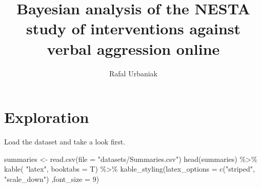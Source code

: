 \documentclass[
  10pt,
  dvipsnames,enabledeprecatedfontcommands]{scrartcl}
\title{Bayesian analysis of the NESTA study of interventions against
verbal aggression online}
\author{Rafal Urbaniak}
\date{}
\newenvironment{Shaded}{\begin{snugshade}}{\end{snugshade}}
\newcommand{\AttributeTok}[1]{\textcolor[rgb]{0.77,0.63,0.00}{#1}}
\newcommand{\DecValTok}[1]{\textcolor[rgb]{0.00,0.00,0.81}{#1}}
\newcommand{\FunctionTok}[1]{\textcolor[rgb]{0.00,0.00,0.00}{#1}}
\newcommand{\NormalTok}[1]{#1}
\newcommand{\OtherTok}[1]{\textcolor[rgb]{0.56,0.35,0.01}{#1}}
\newcommand{\SpecialCharTok}[1]{\textcolor[rgb]{0.00,0.00,0.00}{#1}}
\newcommand{\StringTok}[1]{\textcolor[rgb]{0.31,0.60,0.02}{#1}}
\begin{document}
\maketitle

\tableofcontents

\hypertarget{exploration}{%
\section{Exploration}\label{exploration}}

Load the dataset and take a look first.

\vspace{1mm}
\footnotesize

\begin{Shaded}
\begin{Highlighting}[]
\NormalTok{summaries }\OtherTok{\textless{}{-}} \FunctionTok{read.csv}\NormalTok{(}\AttributeTok{file =} \StringTok{"datasets/Summaries.csv"}\NormalTok{)}
\FunctionTok{head}\NormalTok{(summaries) }\SpecialCharTok{\%\textgreater{}\%} \FunctionTok{kable}\NormalTok{( }\StringTok{"latex"}\NormalTok{, }\AttributeTok{booktabs =}\NormalTok{ T) }\SpecialCharTok{\%\textgreater{}\%} 
  \FunctionTok{kable\_styling}\NormalTok{(}\AttributeTok{latex\_options =} \FunctionTok{c}\NormalTok{(}\StringTok{"striped"}\NormalTok{, }\StringTok{"scale\_down"}\NormalTok{) ,}\AttributeTok{font\_size =} \DecValTok{9}\NormalTok{)}
\end{Highlighting}
\end{Shaded}
\end{document}

